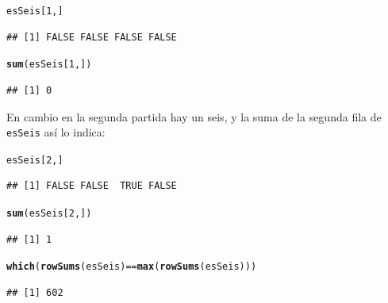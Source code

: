 \documentclass[10pt,a4paper]{article}\usepackage[]{graphicx}\usepackage[]{color}
\makeatletter
\newcommand{\hlnum}[1]{\textcolor[rgb]{0.686,0.059,0.569}{#1}}%
\newcommand{\hlopt}[1]{\textcolor[rgb]{0,0,0}{#1}}%
\newcommand{\hlstd}[1]{\textcolor[rgb]{0.345,0.345,0.345}{#1}}%
\newcommand{\hlkwd}[1]{\textcolor[rgb]{0.737,0.353,0.396}{\textbf{#1}}}%
\newenvironment{kframe}{%
 \def\at@end@of@kframe{}%
 \ifinner\ifhmode%
  \def\at@end@of@kframe{\end{minipage}}%
  \begin{minipage}{\columnwidth}%
 \fi\fi%
 \def\FrameCommand##1{\hskip\@totalleftmargin \hskip-\fboxsep
 \colorbox{shadecolor}{##1}\hskip-\fboxsep
     \hskip-\linewidth \hskip-\@totalleftmargin \hskip\columnwidth}%
 \MakeFramed {\advance\hsize-\width
   \@totalleftmargin\z@ \linewidth\hsize
   \@setminipage}}%
 {\par\unskip\endMakeFramed%
 \at@end@of@kframe}
\newenvironment{knitrout}{}{} %
\makeatother
\begin{document}
\begin{knitrout}
\color{fgcolor}\begin{kframe}
\begin{alltt}
\hlstd{esSeis[}\hlnum{1}\hlstd{, ]}
\end{alltt}
\begin{verbatim}
## [1] FALSE FALSE FALSE FALSE
\end{verbatim}
\begin{alltt}
                                                                                                                                                            \hlkwd{sum}\hlstd{(esSeis[}\hlnum{1}\hlstd{, ])}
\end{alltt}
\begin{verbatim}
## [1] 0
\end{verbatim}
\end{kframe}
\end{knitrout}
                                                                                                                                                                 En cambio en la segunda partida hay un seis, y la suma de la segunda fila de {\tt esSeis} así lo indica:
\begin{knitrout}
\color{fgcolor}\begin{kframe}
\begin{alltt}
\hlstd{esSeis[}\hlnum{2}\hlstd{, ]}
\end{alltt}
\begin{verbatim}
## [1] FALSE FALSE  TRUE FALSE
\end{verbatim}
\begin{alltt}
                                                                                                                                                            \hlkwd{sum}\hlstd{(esSeis[}\hlnum{2}\hlstd{, ])}
\end{alltt}
\begin{verbatim}
## [1] 1
\end{verbatim}
\begin{alltt}
                                                                                                                                                            \hlkwd{which}\hlstd{(}\hlkwd{rowSums}\hlstd{(esSeis)} \hlopt{==} \hlkwd{max}\hlstd{(}\hlkwd{rowSums}\hlstd{(esSeis)))}
\end{alltt}
\begin{verbatim}
## [1] 602
\end{verbatim}
\end{kframe}
\end{knitrout}
\end{document}
